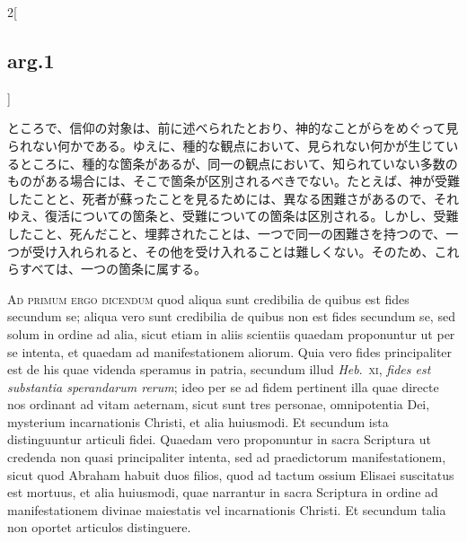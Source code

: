 \documentclass[paper=a4paper,fontsize=10pt,jafontsize=9pt,titlepage]{jlreq}
\begin{document}
\begin{paracol}{2}[\subsection{arg.1}]
\switchcolumn

ところで、信仰の対象は、前に述べられたとおり、神的なことがらをめぐって見
 られない何かである。ゆえに、種的な観点において、見られない何かが生じてい
 るところに、種的な箇条があるが、同一の観点において、知られていない多数の
 ものがある場合には、そこで箇条が区別されるべきでない。たとえば、神が受難
 したことと、死者が蘇ったことを見るためには、異なる困難さがあるので、それ
 ゆえ、復活についての箇条と、受難についての箇条は区別される。しかし、受難
 したこと、死んだこと、埋葬されたことは、一つで同一の困難さを持つので、一
 つが受け入れられると、その他を受け入れることは難しくない。そのため、これ
 らすべては、一つの箇条に属する。

\switchcolumn*[\subsection{ad.1}]

{\scshape Ad primum ergo dicendum} quod aliqua sunt
credibilia de quibus est fides secundum se; aliqua vero sunt credibilia
de quibus non est fides secundum se, sed solum in ordine ad alia, sicut
etiam in aliis scientiis quaedam proponuntur ut per se intenta, et
quaedam ad manifestationem aliorum. Quia vero fides principaliter est de
his quae videnda speramus in patria, secundum illud {\itshape Heb}.~{\scshape xi}, {\itshape fides est
substantia sperandarum rerum}; ideo per se ad fidem pertinent illa quae
directe nos ordinant ad vitam aeternam, sicut sunt tres personae,
omnipotentia Dei, mysterium incarnationis Christi, et alia huiusmodi. Et
secundum ista distinguuntur articuli fidei. Quaedam vero proponuntur in
sacra Scriptura ut credenda non quasi principaliter intenta, sed ad
praedictorum manifestationem, sicut quod Abraham habuit duos filios,
quod ad tactum ossium Elisaei suscitatus est mortuus, et alia huiusmodi,
quae narrantur in sacra Scriptura in ordine ad manifestationem divinae
maiestatis vel incarnationis Christi. Et secundum talia non oportet
articulos distinguere.

\switchcolumn


\end{paracol}
\end{document}
